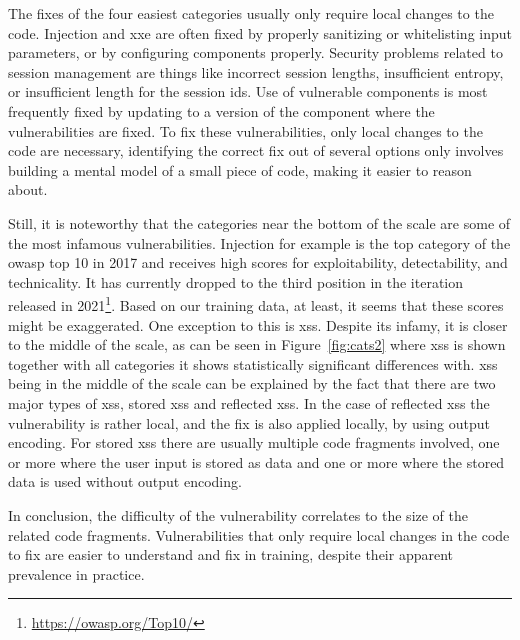 The fixes of the four easiest categories usually only require local changes to the code.
Injection and \gls{xxe} are often fixed by properly sanitizing or whitelisting input parameters, or by configuring components properly.
Security problems related to session management are things like incorrect session lengths, insufficient entropy, or insufficient length for the session \glspl{id}.
Use of vulnerable components is most frequently fixed by updating to a version of the component where the vulnerabilities are fixed.
To fix these vulnerabilities, only local changes to the code are necessary, identifying the correct fix out of several options only involves building a mental model of a small piece of code, making it easier to reason about.

Still, it is noteworthy that the categories near the bottom of the scale are some of the most infamous vulnerabilities.
Injection for example is the top category of the \gls{owasp} top 10 in 2017 and receives high scores for exploitability, detectability, and technicality.
It has currently dropped to the third position in the iteration released in 2021\footnote{\url{https://owasp.org/Top10/}}.
Based on our training data, at least, it seems that these scores might be exaggerated.
One exception to this is \gls{xss}.
Despite its infamy, it is closer to the middle of the scale, as can be seen in Figure~\ref{fig:cats2} where \gls{xss} is shown together with all categories it shows statistically significant differences with.
\Gls{xss} being in the middle of the scale can be explained by the fact that there are two major types of \gls{xss}, stored \gls{xss} and reflected \gls{xss}. 
In the case of reflected \gls{xss} the vulnerability is rather local, and the fix is also applied locally, by using output encoding.
For stored \gls{xss} there are usually multiple code fragments involved, one or more where the user input is stored as data and one or more where the stored data is used without output encoding.

In conclusion, the difficulty of the vulnerability correlates to the size of the related code fragments.
Vulnerabilities that only require local changes in the code to fix are easier to understand and fix in training, despite their apparent prevalence in practice.

